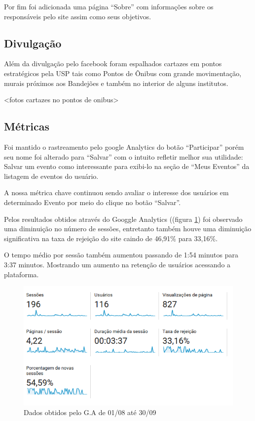 \par Por fim foi adicionada uma página ``Sobre'' com informações sobre os responsáveis pelo site assim como seus objetivos.
\subsection{Divulgação}
\par Além da divulgação pelo facebook foram espalhados cartazes em pontos estratégicos pela USP tais como Pontos de Ônibus com grande movimentação, murais próximos aos Bandejões e também no interior de alguns institutos.

<fotos cartazes no pontos de onibus>

\subsection{Métricas}

\par Foi mantido o rastreamento pelo google Analytics do botão ``Participar'' porém seu nome foi alterado para ``Salvar'' com o intuito refletir melhor sua utilidade: Salvar um evento como interessante para exibi-lo na seção de ``Meus Eventos'' da listagem de eventos do usuário.

\par A nossa métrica chave continuou sendo avaliar o interesse dos usuários em determinado Evento por meio do clique no botão ``Salvar''.

\par Pelos resultados obtidos através do Googgle Analytics ((figura \ref{fig:analytics_2ainteracao_dados}) foi observado uma diminuição no número de sessões, entretanto também houve uma diminuição significativa na taxa de rejeição do site caindo de 46,91\% para 33,16\%.
\par O tempo médio por sessão também aumentou passando de 1:54 minutos para 3:37 minutos. Mostrando um aumento na retenção de usuários acessando a plataforma.
\begin{figure}[htb]
\centering
\includegraphics[width=15cm]{figuras/analytics_2ainteracao_dados}
\caption{\label{fig:analytics_2ainteracao_dados} Dados obtidos pelo G.A de 01/08 até 30/09}
\end{figure}

